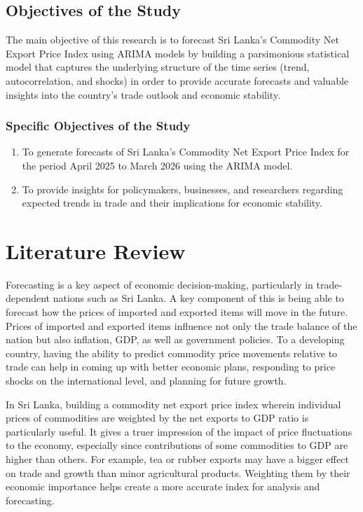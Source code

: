 \documentclass[12pt,a4paper]{report} %
\begin{document}
	\section{Objectives of the Study}
	
	The main objective of this research is to forecast Sri Lanka’s Commodity Net Export Price Index using ARIMA models by building a parsimonious statistical model that captures the underlying structure of the time series (trend, autocorrelation, and shocks) in order to provide accurate forecasts and valuable insights into the country’s trade outlook and economic stability.
	
	\subsection{Specific Objectives of the Study}
	
	\begin{enumerate}
		\item To generate forecasts of Sri Lanka’s Commodity Net Export Price Index for the period April 2025 to March 2026 using the ARIMA model.
		\item To provide insights for policymakers, businesses, and researchers regarding expected trends in trade and their implications for economic stability.
	\end{enumerate}
	
	
	
	\setcounter{chapter}{1}
	
	\chapter{Literature Review } %
	
	Forecasting is a key aspect of economic decision-making, particularly in trade-dependent nations such as Sri Lanka. A key component of this is being able to forecast how the prices of imported and exported items will move in the future. Prices of imported and exported items influence not only the trade balance of the nation but also inflation, GDP, as well as government policies. To a developing country, having the ability to predict commodity price movements relative to trade can help in coming up with better economic plans, responding to price shocks on the international level, and planning for future growth. 
	
	In Sri Lanka, building a commodity net export price index wherein individual prices of commodities are weighted by the net exports to GDP ratio is particularly useful. It gives a truer impression of the impact of price fluctuations to the economy, especially since contributions of some commodities to GDP are higher than others. For example, tea or rubber exports may have a bigger effect on trade and growth than minor agricultural products. Weighting them by their economic importance helps create a more accurate index for analysis and forecasting. 
	
\end{document}
